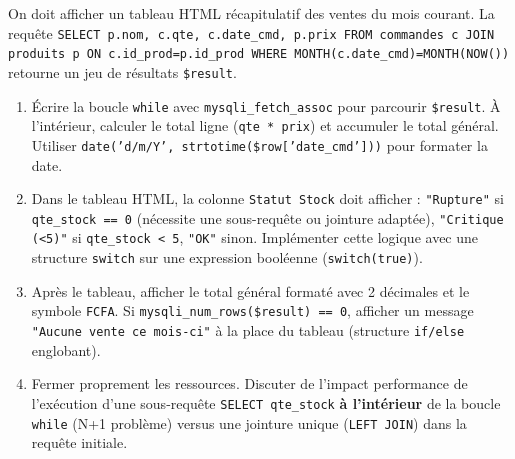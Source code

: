 \documentclass[11pt]{article}
\begin{document}
\begin{exercice}
On doit afficher un tableau HTML récapitulatif des ventes du mois courant. La requête \texttt{SELECT p.nom, c.qte, c.date\_cmd, p.prix FROM commandes c JOIN produits p ON c.id\_prod=p.id\_prod WHERE MONTH(c.date\_cmd)=MONTH(NOW())} retourne un jeu de résultats \texttt{\$result}.

\begin{enumerate}
    \item Écrire la boucle \texttt{while} avec \texttt{mysqli\_fetch\_assoc} pour parcourir \texttt{\$result}. À l'intérieur, calculer le total ligne (\texttt{qte * prix}) et accumuler le total général. Utiliser \texttt{date('d/m/Y', strtotime(\$row['date\_cmd']))} pour formater la date.
    \item Dans le tableau HTML, la colonne \texttt{Statut Stock} doit afficher : \texttt{"Rupture"} si \texttt{qte\_stock == 0} (nécessite une sous-requête ou jointure adaptée), \texttt{"Critique (<5)"} si \texttt{qte\_stock < 5}, \texttt{"OK"} sinon. Implémenter cette logique avec une structure \texttt{switch} sur une expression booléenne (\texttt{switch(true)}).
    \item Après le tableau, afficher le total général formaté avec 2 décimales et le symbole \texttt{FCFA}. Si \texttt{mysqli\_num\_rows(\$result) == 0}, afficher un message \texttt{"Aucune vente ce mois-ci"} à la place du tableau (structure \texttt{if/else} englobant).
    \item Fermer proprement les ressources. Discuter de l'impact performance de l'exécution d'une sous-requête \texttt{SELECT qte\_stock} \textbf{à l'intérieur} de la boucle \texttt{while} (N+1 problème) versus une jointure unique (\texttt{LEFT JOIN}) dans la requête initiale.
\end{enumerate}
\end{exercice}
\end{document}
